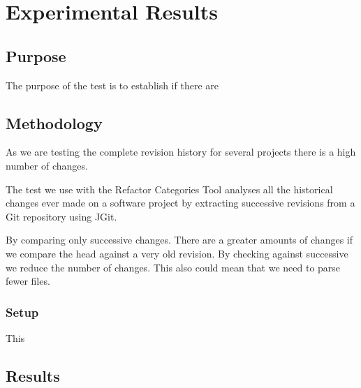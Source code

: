
\chapter{Experimental Results}

\section{Purpose}
The purpose of the test is to establish if there are 

\section{Methodology}
As we are testing the complete revision history for several projects there is a high number of changes. 

The test we use with the Refactor Categories Tool analyses all the historical changes ever made on a software project by extracting successive revisions from a Git repository using JGit.

By comparing only successive changes.
  There are a greater amounts of changes if we compare the head against a very old revision. By checking against successive we reduce the number of changes. This also could mean that we need to parse fewer files.

\subsection{Setup}
This 
% 
% 
% 
% 
% 
% 

\section{Results}
